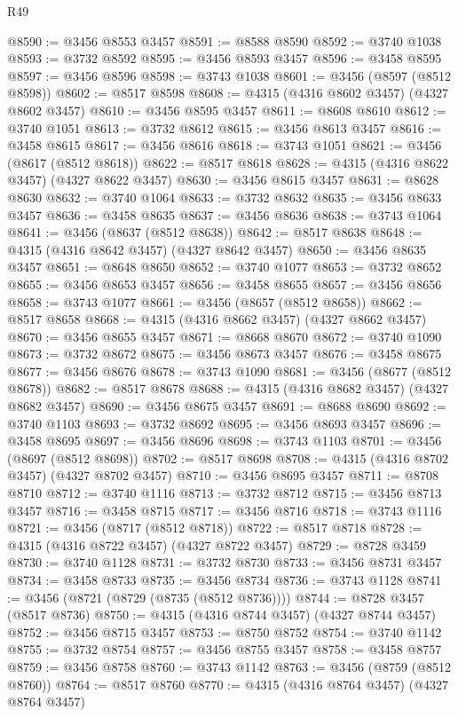 \begin{lexlean}{R49}
\begin{coremodule}
@8590 := @3456 @8553 @3457
@8591 := @8588 @8590
@8592 := @3740 @1038
@8593 := @3732 @8592
@8595 := @3456 @8593 @3457
@8596 := @3458 @8595
@8597 := @3456 @8596
@8598 := @3743 @1038
@8601 := @3456 (@8597 (@8512 @8598))
@8602 := @8517 @8598
@8608 := @4315 (@4316 @8602 @3457) (@4327 @8602 @3457)
@8610 := @3456 @8595 @3457
@8611 := @8608 @8610
@8612 := @3740 @1051
@8613 := @3732 @8612
@8615 := @3456 @8613 @3457
@8616 := @3458 @8615
@8617 := @3456 @8616
@8618 := @3743 @1051
@8621 := @3456 (@8617 (@8512 @8618))
@8622 := @8517 @8618
@8628 := @4315 (@4316 @8622 @3457) (@4327 @8622 @3457)
@8630 := @3456 @8615 @3457
@8631 := @8628 @8630
@8632 := @3740 @1064
@8633 := @3732 @8632
@8635 := @3456 @8633 @3457
@8636 := @3458 @8635
@8637 := @3456 @8636
@8638 := @3743 @1064
@8641 := @3456 (@8637 (@8512 @8638))
@8642 := @8517 @8638
@8648 := @4315 (@4316 @8642 @3457) (@4327 @8642 @3457)
@8650 := @3456 @8635 @3457
@8651 := @8648 @8650
@8652 := @3740 @1077
@8653 := @3732 @8652
@8655 := @3456 @8653 @3457
@8656 := @3458 @8655
@8657 := @3456 @8656
@8658 := @3743 @1077
@8661 := @3456 (@8657 (@8512 @8658))
@8662 := @8517 @8658
@8668 := @4315 (@4316 @8662 @3457) (@4327 @8662 @3457)
@8670 := @3456 @8655 @3457
@8671 := @8668 @8670
@8672 := @3740 @1090
@8673 := @3732 @8672
@8675 := @3456 @8673 @3457
@8676 := @3458 @8675
@8677 := @3456 @8676
@8678 := @3743 @1090
@8681 := @3456 (@8677 (@8512 @8678))
@8682 := @8517 @8678
@8688 := @4315 (@4316 @8682 @3457) (@4327 @8682 @3457)
@8690 := @3456 @8675 @3457
@8691 := @8688 @8690
@8692 := @3740 @1103
@8693 := @3732 @8692
@8695 := @3456 @8693 @3457
@8696 := @3458 @8695
@8697 := @3456 @8696
@8698 := @3743 @1103
@8701 := @3456 (@8697 (@8512 @8698))
@8702 := @8517 @8698
@8708 := @4315 (@4316 @8702 @3457) (@4327 @8702 @3457)
@8710 := @3456 @8695 @3457
@8711 := @8708 @8710
@8712 := @3740 @1116
@8713 := @3732 @8712
@8715 := @3456 @8713 @3457
@8716 := @3458 @8715
@8717 := @3456 @8716
@8718 := @3743 @1116
@8721 := @3456 (@8717 (@8512 @8718))
@8722 := @8517 @8718
@8728 := @4315 (@4316 @8722 @3457) (@4327 @8722 @3457)
@8729 := @8728 @3459
@8730 := @3740 @1128
@8731 := @3732 @8730
@8733 := @3456 @8731 @3457
@8734 := @3458 @8733
@8735 := @3456 @8734
@8736 := @3743 @1128
@8741 := @3456 (@8721 (@8729 (@8735 (@8512 @8736))))
@8744 := @8728 @3457 (@8517 @8736)
@8750 := @4315 (@4316 @8744 @3457) (@4327 @8744 @3457)
@8752 := @3456 @8715 @3457
@8753 := @8750 @8752
@8754 := @3740 @1142
@8755 := @3732 @8754
@8757 := @3456 @8755 @3457
@8758 := @3458 @8757
@8759 := @3456 @8758
@8760 := @3743 @1142
@8763 := @3456 (@8759 (@8512 @8760))
@8764 := @8517 @8760
@8770 := @4315 (@4316 @8764 @3457) (@4327 @8764 @3457)

\end{coremodule}
\end{lexlean}

